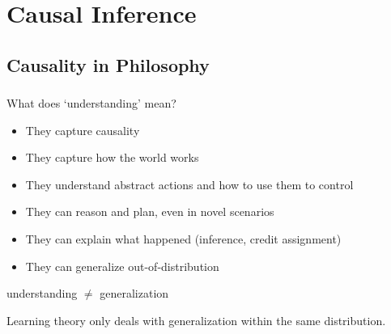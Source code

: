 \documentclass[UTF8,11pt,colorlinks,compress,openany]{beamer}%
\begin{document}
\section{Causal Inference}


\subsection{Causality in Philosophy}

\begin{frame}\frametitle{}
What does `understanding' mean?
\begin{itemize}
	\item They capture causality
	\item They capture how the world works
	\item They understand abstract actions and how to use them to control
	\item They can reason and plan, even in novel scenarios
	\item They can explain what happened (inference, credit assignment)
	\item They can generalize out-of-distribution
\end{itemize}
\centerline{understanding $\ne$ generalization}
Learning theory only deals with generalization within the same distribution.
\end{frame}
\end{document}
